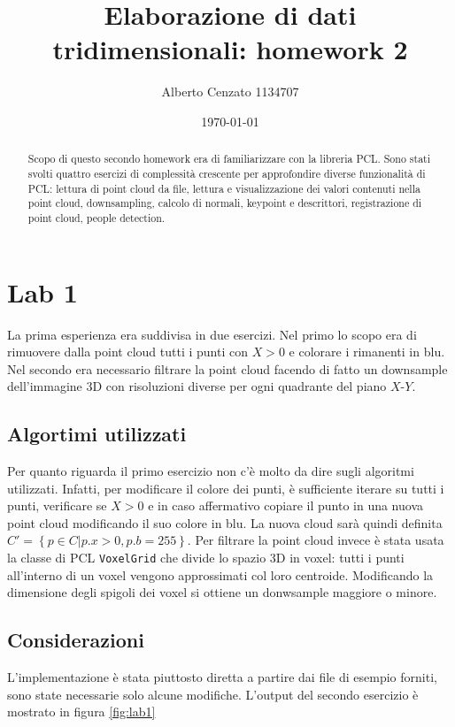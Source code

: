 \documentclass[a4paper]{article}
\title{Elaborazione di dati tridimensionali: homework 2}
\author{Alberto Cenzato 1134707}
\date{\today}
\begin{document}
\maketitle

\begin{abstract}
Scopo di questo secondo homework era di familiarizzare con la libreria PCL. Sono stati svolti quattro esercizi di complessità crescente per approfondire diverse funzionalità di PCL: lettura di point cloud da file, lettura e visualizzazione dei valori contenuti nella point cloud, downsampling, calcolo di normali, keypoint e descrittori, registrazione di point cloud, people detection.
\end{abstract}

\section{Lab 1} \label{sec:lab1}
La prima esperienza era suddivisa in due esercizi. Nel primo lo scopo era di rimuovere dalla point cloud tutti i punti con $X > 0$ e colorare i rimanenti in blu. Nel secondo era necessario filtrare la point cloud facendo di fatto un downsample dell'immagine 3D con risoluzioni diverse per ogni quadrante del piano $X$-$Y$.

	\subsection{Algortimi utilizzati}
	Per quanto riguarda il primo esercizio non c'è molto da dire sugli algoritmi utilizzati. Infatti, per modificare il colore dei punti, è sufficiente iterare su tutti i punti, verificare se $X > 0$ e in caso affermativo copiare il punto in una nuova point cloud modificando il suo colore in blu. La nuova cloud sarà quindi definita $C' = \left\{p \in C | p.x > 0, p.b = 255 \right\}$.
	Per filtrare la point cloud invece è stata usata la classe di PCL \verb|VoxelGrid| che divide lo spazio 3D in voxel: tutti i punti all'interno di un voxel vengono approssimati col loro centroide. Modificando la dimensione degli spigoli dei voxel si ottiene un donwsample maggiore o minore.
	
	\subsection{Considerazioni}
	L'implementazione è stata piuttosto diretta a partire dai file di esempio forniti, sono state necessarie solo alcune modifiche. L'output del secondo esercizio è mostrato in figura \ref{fig:lab1} 
	
\end{document}
